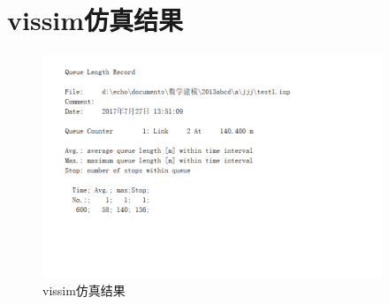 \documentclass[UTF8,12.05pt]{ctexart}
\begin{document}
\section{vissim仿真结果}
\begin{figure}[H]
  \centering
  \includegraphics[width=4.00in]{vissim.png}
  \caption{vissim仿真结果}
\end{figure}
\end{document}
